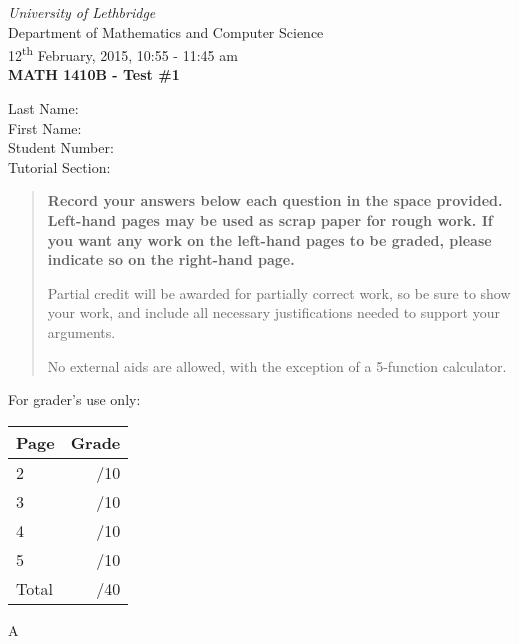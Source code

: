 \documentclass[12pt]{article}
\newcommand{\skipline}{\vspace{12pt}}
\begin{document}
\author{Instructor: Sean Fitzpatrick}
\thispagestyle{plain}
\begin{center}
\emph{University of Lethbridge}\\
Department of Mathematics and Computer Science\\
12\textsuperscript{th} February, 2015, 10:55 - 11:45 am\\
{\bf MATH 1410B - Test \#1}\\
\end{center}
\skipline \skipline \skipline \noindent \skipline
Last Name:\underline{\hspace{353pt}}\\
\skipline
First Name:\underline{\hspace{350pt}}\\
\skipline
Student Number:\underline{\hspace{323pt}}\\
\skipline
Tutorial Section: \underline{\hspace{320pt}}\\


\vspace{0.5in}


\begin{quote}
 {\bf Record your answers below each question in the space provided.    Left-hand pages may be used as scrap paper for rough work.  If you want any work on the left-hand pages to be graded, please indicate so on the right-hand page.
 
 \bigskip
 
Partial credit will be awarded for partially correct work, so be sure to show your work, and include all necessary justifications needed to support your arguments.

\bigskip

No external aids are allowed, with the exception of a 5-function calculator.}
\end{quote}


\vspace{0.5in}

For grader's use only:

\begin{table}[hbt]
\begin{center}
\begin{tabular}{|l|r|} \hline
Page&Grade\\
\hline \hline
\cline{1-2} 2 & \enspace\enspace\enspace\enspace\enspace\enspace/10\\
\cline{1-2} 3 & \enspace\enspace\enspace\enspace\enspace\enspace/10\\
\cline{1-2} 4 & \enspace\enspace\enspace\enspace\enspace\enspace/10\\
\cline{1-2} 5 & \enspace\enspace\enspace\enspace\enspace\enspace/10\\
\cline{1-2} Total & \enspace\enspace\enspace\enspace\enspace\enspace/40\\
\hline
\end{tabular}

\skipline

\skipline

\skipline

A
\end{center}
\end{table}
\newpage
\end{document}
